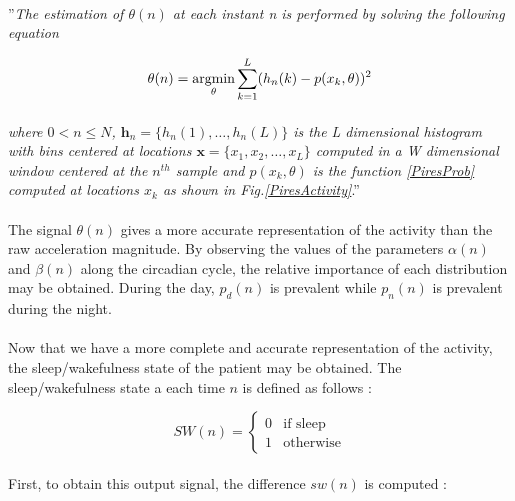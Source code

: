 \documentclass[a4paper,12pt]{article}
\begin{document}
\paragraph{}
''\textit{The estimation of $\theta(n)$ at each instant n is performed by solving the following equation}

\begin{equation}
\theta(n) = \operatornamewithlimits{argmin}\limits_{\theta} \sum_{k=1}^L (h_n(k) - p(x_k, \theta))^2
\end{equation}

\paragraph{}
\textit{where $0 < n \leq N$, $\mathbf{h}_n = \{h_n(1), \ldots, h_n(L)\}$ is the L dimensional histogram with bins centered at locations $\mathbf{x} = \{x_1, x_2, \ldots, x_L\}$ computed in a W dimensional window centered at the $n^{th}$ sample and $p(x_k, \theta)$ is the function \ref{PiresProb} computed at locations $x_k$ as shown in Fig.\ref{PiresActivity}}.''\cite{Pires2009}

\paragraph{}
The signal $\theta(n)$ gives a more accurate representation of the activity than the raw acceleration magnitude. By observing the values of the parameters $\alpha(n)$ and $\beta(n)$ along the circadian cycle, the relative importance of each distribution may be obtained. During the day, $p_d(n)$ is prevalent while $p_n(n)$ is prevalent during the night.

\paragraph{}
Now that we have a more complete and accurate representation of the activity, the sleep/wakefulness state of the patient may be obtained. The sleep/wakefulness state a each time $n$ is defined as follows :

\begin{equation}
SW(n) = \left\{
    \begin{array}{ll}
        0 & \mbox{if sleep} \\
        1 & \mbox{otherwise}
    \end{array}
\right.
\end{equation}

\paragraph{}
First, to obtain this output signal, the difference $sw(n)$ is computed :
\end{document}

